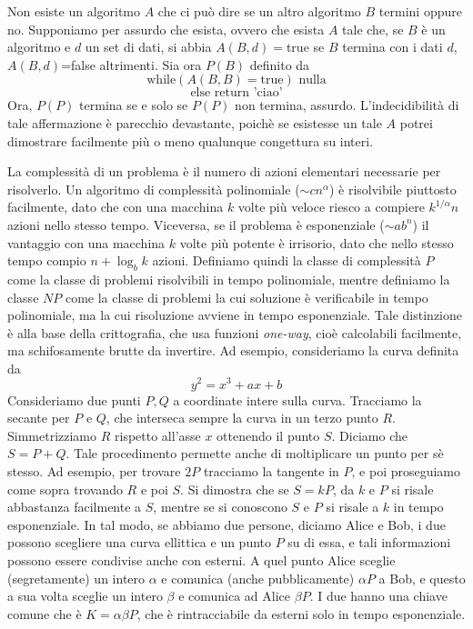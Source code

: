 \documentclass[a4paper,11pt]{article}
\begin{document}
\begin{enumerate}[resume]
	\noindent Non esiste un algoritmo $A$ che ci può dire se un altro algoritmo $B$ termini oppure no. Supponiamo per assurdo che esista, ovvero che esista $A$ tale che, se $B$ è un algoritmo e $d$ un set di dati, si abbia $A(B,d)=$true se $B$ termina con i dati $d$, $A(B,d)$=false altrimenti. Sia ora $P(B)$ definito da 
	\[\textrm{while}(A(B,B)=\textrm{true}) \textrm{ nulla}\]
	\[\textrm{else return 'ciao'}\]
	Ora, $P(P)$ termina se e solo se $P(P)$ non termina, assurdo. L'indecidibilità di tale affermazione è parecchio devastante, poichè se esistesse un tale $A$ potrei dimostrare facilmente più o meno qualunque congettura su interi.
	
	\noindent La complessità di un problema è il numero di azioni elementari necessarie per risolverlo. Un algoritmo di complessità polinomiale ($\sim cn^\alpha$) è risolvibile piuttosto facilmente, dato che con una macchina $k$ volte più veloce riesco a compiere $k^{1/\alpha}n$ azioni nello stesso tempo. Viceversa, se il problema è esponenziale ($\sim ab^n$) il vantaggio con una macchina $k$ volte più potente è irrisorio, dato che nello stesso tempo compio $n+\log_bk$ azioni. Definiamo quindi la classe di complessità $P$ come la classe di problemi risolvibili in tempo polinomiale, mentre definiamo la classe $NP$ come la classe di problemi la cui soluzione è verificabile in tempo polinomiale, ma la cui risoluzione avviene in tempo esponenziale. Tale distinzione è alla base della crittografia, che usa funzioni \textit{one-way}, cioè calcolabili facilmente, ma schifosamente brutte da invertire.
	Ad esempio, consideriamo la curva definita da
	\[y^2=x^3+ax+b\]
	Consideriamo due punti $P,Q$ a coordinate intere sulla curva. Tracciamo la secante per $P$ e $Q$, che interseca sempre la curva in un terzo punto $R$. Simmetrizziamo $R$ rispetto all'asse $x$ ottenendo il punto $S$. Diciamo che $S=P+Q$. Tale procedimento permette anche di moltiplicare un punto per sè stesso. Ad esempio, per trovare $2P$ tracciamo la tangente in $P$, e poi proseguiamo come sopra trovando $R$ e poi $S$. Si dimostra che se $S=kP$, da $k$ e $P$ si risale abbastanza facilmente a $S$, mentre se si conoscono $S$ e $P$ si risale a $k$ in tempo esponenziale. In tal modo, se abbiamo due persone, diciamo Alice e Bob, i due possono scegliere una curva ellittica e un punto $P$ su di essa, e tali informazioni possono essere condivise anche con esterni. A quel punto Alice sceglie (segretamente) un intero $\alpha$ e comunica (anche pubblicamente) $\alpha P$ a Bob, e questo a sua volta sceglie un intero $\beta$ e comunica ad Alice $\beta P$. I due hanno una chiave comune che è $K=\alpha\beta P$, che è rintracciabile da esterni solo in tempo esponenziale.
	

\end{enumerate}
\end{document}
